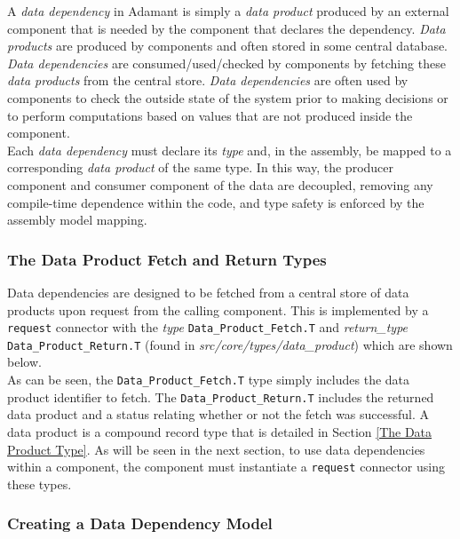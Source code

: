 A \textit{data dependency} in Adamant is simply a \textit{data product} produced by an external component that is needed by the component that declares the dependency. \textit{Data products} are produced by components and often stored in some central database. \textit{Data dependencies} are consumed/used/checked by components by fetching these \textit{data products} from the central store. \textit{Data dependencies} are often used by components to check the outside state of the system prior to making decisions or to perform computations based on values that are not produced inside the component. \\

Each \textit{data dependency} must declare its \textit{type} and, in the assembly, be mapped to a corresponding \textit{data product} of the same type. In this way, the producer component and consumer component of the data are decoupled, removing any compile-time dependence within the code, and type safety is enforced by the assembly model mapping.

\subsubsection{The Data Product Fetch and Return Types}

Data dependencies are designed to be fetched from a central store of data products upon request from the calling component. This is implemented by a \texttt{request} connector with the \textit{type} \texttt{Data\_Product\_Fetch.T} and \textit{return\_type} \texttt{Data\_Product\_Return.T} (found in \textit{src/core/types/data\_product}) which are shown below. \\




As can be seen, the \texttt{Data\_Product\_Fetch.T} type simply includes the data product identifier to fetch. The \texttt{Data\_Product\_Return.T} includes the returned data product and a status relating whether or not the fetch was successful. A data product is a compound record type that is detailed in Section \ref{The Data Product Type}. As will be seen in the next section, to use data dependencies within a component, the component must instantiate a \texttt{request} connector using these types.

\subsubsection{Creating a Data Dependency Model}

